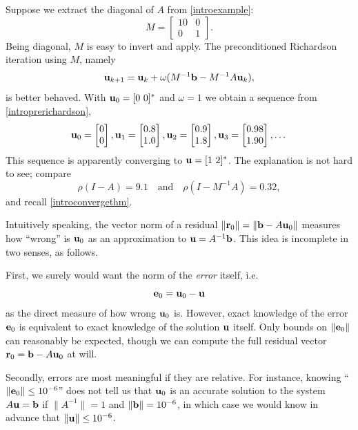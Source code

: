 \medskip\noindent\hrulefill
\begin{examplecont} \label{example:ls:jacobirichardson}  Suppose we extract the diagonal of $A$ from  \eqref{introexample}:
\begin{equation}
M = \begin{bmatrix}
10 & 0 \\ 0 & 1
\end{bmatrix}.  \label{introM}
\end{equation}
Being diagonal, $M$ is easy to invert and apply.  The preconditioned Richardson iteration using $M$, namely
\begin{equation}
\mathbf{u}_{k+1} = \mathbf{u}_k + \omega (M^{-1} \mathbf{b} - M^{-1} A \mathbf{u}_k),  \label{introprerichardson}
\end{equation}
is better behaved.  With $\mathbf{u}_0 = [0\,\, 0]^*$ and $\omega=1$ we obtain a sequence from \eqref{introprerichardson},
\begin{equation}
{\mathbf{u}}_{0} = \begin{bmatrix} 0 \\ 0 \end{bmatrix}, {\mathbf{u}}_{1} = \begin{bmatrix} 0.8 \\ 1.0 \end{bmatrix}, {\mathbf{u}}_{2} = \begin{bmatrix} 0.9 \\ 1.8 \end{bmatrix}, {\mathbf{u}}_{3} = \begin{bmatrix} 0.98 \\ 1.90 \end{bmatrix}, \dots
\end{equation}
This sequence is apparently converging to $\mathbf{u} = [1\,\, 2]^*$.  The explanation is not hard to see; compare
\begin{equation}
\rho(I-A) = 9.1 \quad \text{and} \quad \rho(I-M^{-1} A) = 0.32,
\end{equation}
and recall \eqref{introconvergethm}.
\end{examplecont}
\noindent\hrulefill

\medskip
Intuitively speaking, the vector norm of a residual $\|\mathbf{r}_0\| = \|\mathbf{b} - A \mathbf{u}_0\|$ measures how ``wrong'' is $\mathbf{u}_0$ as an approximation to $\mathbf{u}=A^{-1}\mathbf{b}$.  This idea is incomplete in two senses, as follows.

First, we surely would want the norm of the \emph{error} itself, i.e.
\begin{equation}
\mathbf{e}_0 = \mathbf{u}_0 - \mathbf{u} \label{errordefn}
\end{equation}
as the direct measure of how wrong $\mathbf{u}_0$ is.  However, exact knowledge of the error $\mathbf{e}_0$ is equivalent to exact knowledge of the solution $\mathbf{u}$ itself.  Only bounds on $\|\mathbf{e}_0\|$ can reasonably be expected, though we can compute the full residual vector $\mathbf{r}_0 = \mathbf{b} - A \mathbf{u}_0$ at will.

Secondly, errors are most meaningful if they are relative.  For instance, knowing ``$\|\mathbf{e}_0\|\le 10^{-6}$'' does not tell us that $\mathbf{u}_0$ is an accurate solution to the system $A \mathbf{u} = \mathbf{b}$ if $\|A^{-1}\|=1$ and $\|\mathbf{b}\|= 10^{-6}$, in which case we would know in advance that $\|\mathbf{u}\|\le 10^{-6}$.

